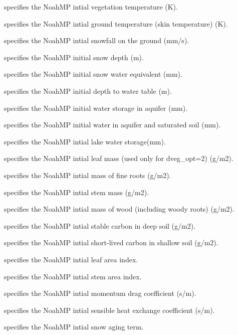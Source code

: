   specifies the NoahMP intial vegetation
 temperature (K).

  specifies the NoahMP intial ground
 temperature (skin temperature) (K).

  specifies the NoahMP intial snowfall on
 the ground (mm/s).

  specifies the NoahMP initial snow
 depth (m).

  specifies the NoahMP initial snow water
 equivalent (mm).

  specifies the NoahMP initial depth to
 water table (m).

  specifies the NoahMP initial water storage
 in aquifer (mm).

  specifies the NoahMP initial water in
 aquifer and saturated soil (mm).

  specifies the NoahMP intial lake water
 storage(mm).

  specifies the NoahMP intial leaf
 mass (used only for dveg\_opt=2) (g/m2).

  specifies the NoahMP intial mass of
 fine roots (g/m2).

  specifies the NoahMP intial stem
 mass (g/m2).

  specifies the NoahMP intial mass of
 wood (including woody roots) (g/m2).

  specifies the NoahMP intial stable
 carbon in deep soil (g/m2).

  specifies the NoahMP intial short-lived
 carbon in shallow soil (g/m2).

  specifies the NoahMP intial leaf area
 index.

  specifies the NoahMP intial stem area
 index.

  specifies the NoahMP intial momentum drag
 coefficient (s/m).

  specifies the NoahMP intial sensible heat
 exchange coefficient (s/m).

  specifies the NoahMP intial snow aging
 term.

